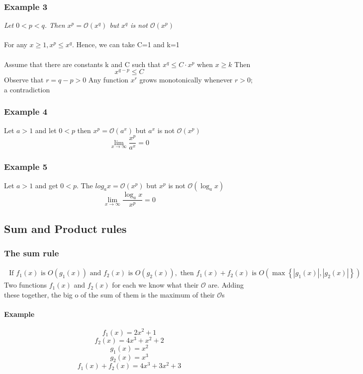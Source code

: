 \documentclass{article}[18pt]
\begin{document}
\subsubsection{Example 3}
\textit{Let $0<p<q$. Then $x^p=\mathcal{O}(x^q)$ but $x^q$ is not $\mathcal{O}(x^p)$}\\
\\
For any $x\geqslant 1, x^p\leqslant x^q$. Hence, we can take C=1 and k=1\\
\\
Assume that there are constants k and C such that $x^q\leqslant C\cdot x^p$ when $x\geqslant k$ Then
$$x^{q-p}\leqslant C$$
Observe that $r=q-p>0$ Any function $x^r$ grows monotonically whenever $r>0$; a contradiction
\subsubsection{Example 4}
Let $a>1$ and let $0<p$ then $x^p=\mathcal{ O }(a^x)$ but $a^x$ is not $\mathcal{O}(x^p)$
$$\lim_{x\to\infty}\frac{x^p}{a^x}= 0$$
\subsubsection{Example 5}
Let $a>1$ and get $0<p$. The  $log_ax=\mathcal{ O }(x^p)$ but $x^p$ is not $\mathcal{ O }(\log_ax)$
 $$\lim_{x\to\infty}\frac{\log_ax}{x^p}= 0$$


\subsection{Sum and Product rules}
\subsubsection{The sum rule}
$$\begin{array} { l } { \text { If } f _ { 1 } ( x ) \text { is } O \left( g _ { 1 } ( x ) \right) \text { and } f _ { 2 } ( x ) \text { is } O \left( g _ { 2 } ( x ) \right) , \text { then } f _ { 1 } ( x ) + f _ { 2 } ( x ) \text { is } } { O \left( \max \left\{ \left| g _ { 1 } ( x ) \right| , \left| g _ { 2 } ( x ) \right| \right\} \right) } \end{array}$$
Two functions $f_1(x)$ and $f_2(x)$ for each we know what their $\mathcal{ O }$ are. Adding these together, the big o of the sum of them is the maximum of their $\mathcal{O}$s\\
\paragraph{Example}
$$f_1(x)=2x^2+1$$
$$f_2(x)=4x^3+x^2+2$$
$$g_1(x)=x^2$$
$$g_2(x)=x^3$$
$$f_1(x)+f_2(x)=4x^3+3x^2+3$$
\end{document}
